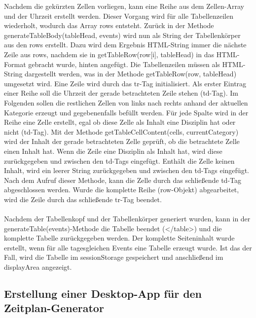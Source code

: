 Nachdem die gekürzten Zellen vorliegen, kann eine Reihe aus dem Zellen-Array und der Uhrzeit erstellt werden. Dieser Vorgang wird für alle Tabellenzeilen wiederholt, wodurch das Array rows entsteht.
Zurück in der Methode generateTableBody(tableHead, events) wird nun als String der Tabellenkörper aus den rows erstellt. Dazu wird dem Ergebnis HTML-String immer die nächste Zeile aus rows, nachdem sie in getTableRow(row[i], tableHead) in das HTML-Format gebracht wurde, hinten angefügt.
Die Tabellenzeilen müssen als HTML-String dargestellt werden, was in der Methode getTableRow(row, tableHead) umgesetzt wird. Eine Zeile wird durch das tr-Tag initialisiert. Als erster Eintrag einer Reihe soll die Uhrzeit der gerade betrachteten Zeile stehen (td-Tag). Im Folgenden sollen die restlichen Zellen von links nach rechts anhand der aktuellen Kategorie erzeugt und gegebenenfalls befüllt werden. Für jede Spalte wird in der Reihe eine Zelle erstellt, egal ob diese Zelle als Inhalt eine Disziplin hat oder nicht (td-Tag). Mit der Methode getTableCellContent(cells, currentCategory) wird der Inhalt der gerade betrachteten Zelle geprüft, ob die betrachtete Zelle einen Inhalt hat. Wenn die Zeile eine Disziplin als Inhalt hat, wird diese zurückgegeben und zwischen den td-Tags eingefügt. Enthält die Zelle keinen Inhalt, wird ein leerer String zurückgegeben und zwischen den td-Tags eingefügt. Nach dem Aufruf dieser Methode, kann die Zelle durch das schließende td-Tag abgeschlossen werden. Wurde die komplette Reihe (row-Objekt) abgearbeitet, wird die Zeile durch das schließende tr-Tag beendet. \\
\\
Nachdem der Tabellenkopf und der Tabellenkörper generiert wurden, kann in der generateTable(events)-Methode die Tabelle beendet (</table>) und die komplette Tabelle zurückgegeben werden.
Der komplette Seiteninhalt wurde erstellt, wenn für alle tagesgleichen Events eine Tabelle erzeugt wurde. Ist das der Fall, wird die Tabelle im sessionStorage gespeichert und anschließend im displayArea angezeigt.

\subsection{Erstellung einer Desktop-App für den Zeitplan-Generator}

